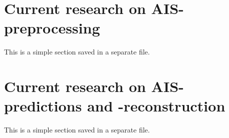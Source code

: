 \section{Current research on AIS-preprocessing}
\begin{info}{}
	This is a simple section saved in a separate file.
\end{info}





\section{Current research on AIS-predictions and -reconstruction}
\begin{info}{}
	This is a simple section saved in a separate file.
\end{info}







